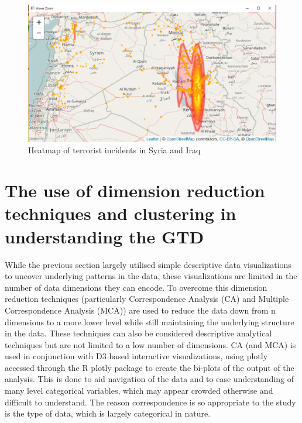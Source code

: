 \begin{figure}[t]
\includegraphics[width=15cm]{Peters_experiment_markdown_files/figure-latex/Capture_KDE_Leaflet_2015_Deaths_Iraq_Syria.png}
\caption{Heatmap of terrorist incidents in Syria and Iraq}
\label{fig:iraqsyriakde}
\centering
\end{figure}
 
\section{The use of dimension reduction techniques and clustering in understanding the GTD}\label{viewing-deaths-by-attack-vector-type} 

While the previous section largely utilised simple descriptive data visualizations to uncover underlying patterns in the data, these visualizations are limited in the number of data dimensions they can encode. To overcome this dimension reduction techniques (particularly Correspondence Analysis (CA) and Multiple Correspondence Analysis (MCA)) are used to reduce the data down from n dimensions to a more lower level while still maintaining the underlying structure in the data. These techniques can also be considered descriptive analytical techniques but are not limited to a low number of dimensions. CA (and MCA) is used in conjunction with D3 \citep{bostock2012d3} based interactive visualizations, using plotly \citep{plotlymanual2016} accessed through the R plotly package to create the bi-plots of the output of the analysis. This is done to aid navigation of the data and to ease understanding of many level categorical variables, which may appear crowded otherwise and difficult to understand. The reason correspondence is so appropriate to the study is the type of  data, which is largely categorical in nature.

